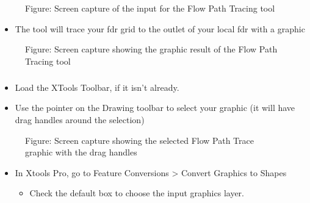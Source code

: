 \documentclass[letterpaper,10pt,english]{sphinxmanual}
\begin{document}
\begin{figure}[htbp]
\centering
\capstart

\noindent{}
\caption{Figure: Screen capture of the input for the Flow Path Tracing tool}\label{\detokenize{ex_2:id21}}\end{figure}
\begin{itemize}
\item {} 
The tool will trace your fdr grid to the outlet of your local fdr with a graphic

\end{itemize}

\begin{figure}[htbp]
\centering
\capstart

\noindent{}
\caption{Figure: Screen capture showing the graphic result of the Flow Path Tracing tool}\label{\detokenize{ex_2:id22}}\end{figure}


\subparagraph{}
\label{\detokenize{ex_2:convert-to-features-single-streams}}\begin{itemize}
\item {} 
Load the XTools Toolbar, if it isn’t already.

\item {} 
Use the pointer on the Drawing toolbar to select your graphic (it will have drag handles around the selection)

\end{itemize}

\begin{figure}[htbp]
\centering
\capstart

\noindent{}
\caption{Figure: Screen capture showing the selected Flow Path Trace graphic with the drag handles}\label{\detokenize{ex_2:id23}}\end{figure}
\begin{itemize}
\item {} 
In Xtools Pro, go to Feature Conversions \textgreater{} Convert Graphics to Shapes
\begin{itemize}
\item {} 
Check the default box to choose the input graphics layer.

\end{itemize}

\end{itemize}
\end{document}
